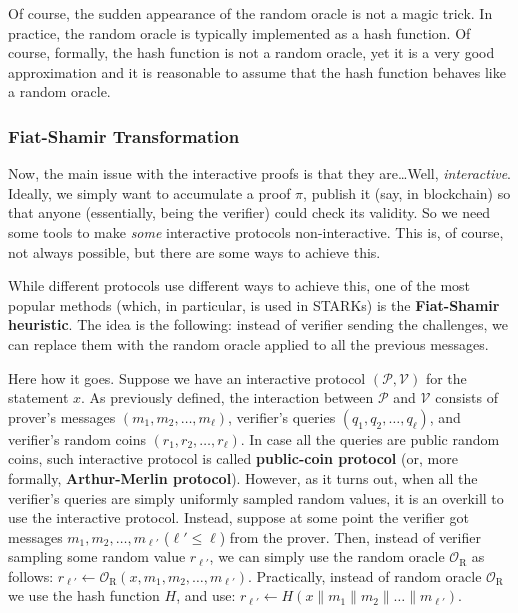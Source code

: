 \documentclass[../lecture-notes-148x210.tex]{subfiles}
\begin{document}
\begin{remark}
    Of course, the sudden appearance of the random oracle is not a magic trick. In practice, the random oracle is typically implemented as a hash function. Of course, formally, the hash function is not a random oracle, yet it is a very good approximation and it is reasonable to assume that the hash function behaves like a random oracle.
\end{remark}

\subsubsection{Fiat-Shamir Transformation}

Now, the main issue with the interactive proofs is that they are\ldots Well, \textit{interactive}. Ideally, we simply want to accumulate a proof $\pi$, publish it (say, in blockchain) so that anyone (essentially, being the verifier) could check its validity. So we need some tools to make \textit{some} interactive protocols non-interactive. This is, of course, not always possible, but there are some ways to achieve this.

While different protocols use different ways to achieve this, one of the most popular methods (which, in particular, is used in STARKs) is the \textbf{Fiat-Shamir heuristic}. The idea is the following: instead of verifier sending the challenges, we can replace them with the random oracle applied to all the previous messages. 

Here how it goes. Suppose we have an interactive protocol $(\mathcal{P}, \mathcal{V})$ for the statement $x$. As previously defined, the interaction between $\mathcal{P}$ and $\mathcal{V}$ consists of prover's messages $(m_1,m_2,\dots,m_{\ell})$, verifier's queries $(q_1,q_2,\dots,q_{\ell})$, and verifier's random coins $(r_1,r_2,\dots,r_{\ell})$. In case all the queries are public random coins, such interactive protocol is called \textbf{public-coin protocol} (or, more formally, \textbf{Arthur-Merlin protocol}). However, as it turns out, when all the verifier's queries are simply uniformly sampled random values, it is an overkill to use the interactive protocol. Instead, suppose at some point the verifier got messages $m_1,m_2,\dots,m_{\ell'}$ ($\ell' \leq \ell$) from the prover. Then, instead of verifier sampling some random value $r_{\ell'}$, we can simply use the random oracle $\mathcal{O}_{\text{R}}$ as follows: $r_{\ell'} \gets \mathcal{O}_{\text{R}}(x,m_1,m_2,\dots,m_{\ell'})$. Practically, instead of random oracle $\mathcal{O}_{\text{R}}$ we use the hash function $H$, and use: $r_{\ell'} \gets H(x \parallel m_1 \parallel m_2 \parallel \dots \parallel m_{\ell'})$.
\end{document}
